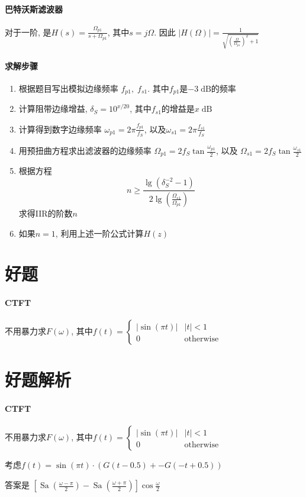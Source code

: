 \documentclass{ctexart}
\DeclareMathOperator{\Sa}{\mathrm{Sa}}
\begin{document}
\paragraph{巴特沃斯滤波器}
    对于一阶, 是$H(s) = \frac{\Omega_{p1}}{s + \Omega_{p1}}$, 其中$s = j \Omega$.
    因此 $|H(\Omega)| = \frac{1}{\sqrt{\left(\frac{\Omega}{\Omega_{p1}}\right)^2 + 1}}$
\paragraph{求解步骤}
    \begin{enumerate}
        \item 根据题目写出模拟边缘频率 $f_{p1},\;f_{s1}$.
            其中$f_{p1}$是$-3 \;\textrm{dB}$的频率
        \item 计算阻带边缘增益, $\delta_S = 10^{x/20}$,
            其中$f_{s1}$的增益是$x \;\textrm{dB}$
        \item 计算得到数字边缘频率 $\omega_{p1} = 2\pi \frac{f_{p1}}{f_S}$,
            以及$\omega_{s1} = 2\pi \frac{f_{s1}}{f_S}$
        \item 用预扭曲方程求出滤波器的边缘频率
            $\Omega_{p1} = 2 f_S \tan \frac{\omega_{p1}}{2}$,
            以及
            $\Omega_{s1} = 2 f_S \tan \frac{\omega_{s1}}{2}$
        \item 根据方程\[
                n \ge \frac
                    { \lg\left(\delta_S^{-2} - 1\right)  }
                    { 2 \lg\left( \frac{\Omega_{s1}}{\Omega_{p1}}\right)} \]
            求得IIR的阶数$n$
        \item 如果$n = 1$, 利用上述一阶公式计算$H(z)$
    \end{enumerate}

\section{好题}
\paragraph{CTFT} 不用暴力求$F(\omega)$, 其中$f(t) = \begin{cases} |\sin(\pi t)| & |t| < 1\\ 0 & \text{otherwise} \end{cases}$


\pagebreak
\section{好题解析}
\paragraph{CTFT} 不用暴力求$F(\omega)$, 其中$f(t) = \begin{cases} |\sin(\pi t)| & |t| < 1\\ 0 & \text{otherwise} \end{cases}$\par
    考虑$f(t) = \sin(\pi t) \cdot \left( G(t-0.5) + -G(-t+0.5) \right)$\par
    答案是 $\left[\Sa\left(\frac{\omega - \pi}{2}\right) - \Sa\left(\frac{\omega + \pi}{2}\right)\right] \cos \frac{\omega}{2}$
\end{document}
